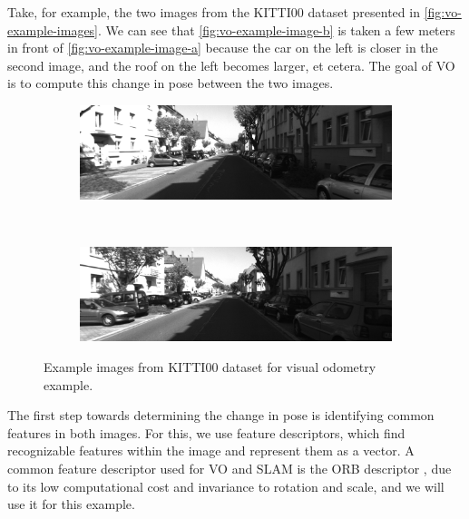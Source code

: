 Take, for example, the two images from the KITTI00 dataset \autocite{Geiger2013IJRR} presented in \autoref{fig:vo-example-images}. We can see that \autoref{fig:vo-example-image-b} is taken a few meters in front of \autoref{fig:vo-example-image-a} because the car on the left is closer in the second image, and the roof on the left becomes larger, et cetera. The goal of VO is to compute this change in pose between the two images.

\begin{figure}[h]
    \centering
    \begin{subfigure}[b]{0.475\textwidth}
        \centering
        \includegraphics[width=\textwidth]{figures/vo_image_8.png}
        \caption{}
        \label{fig:vo-example-image-a}
    \end{subfigure}\hfill%
    ~
    \begin{subfigure}[b]{0.475\textwidth}
        \centering
        \includegraphics[width=\textwidth]{figures/vo_image_9.png}
        \caption{}
        \label{fig:vo-example-image-b}
    \end{subfigure}%
    \caption{Example images from KITTI00 dataset for visual odometry example.}
    \label{fig:vo-example-images}
\end{figure}

The first step towards determining the change in pose is identifying common features in both images. For this, we use feature descriptors, which find recognizable features within the image and represent them as a vector. A common feature descriptor used for VO and SLAM is the ORB descriptor \autocite{6126544}, due to its low computational cost and invariance to rotation and scale, and we will use it for this example.

